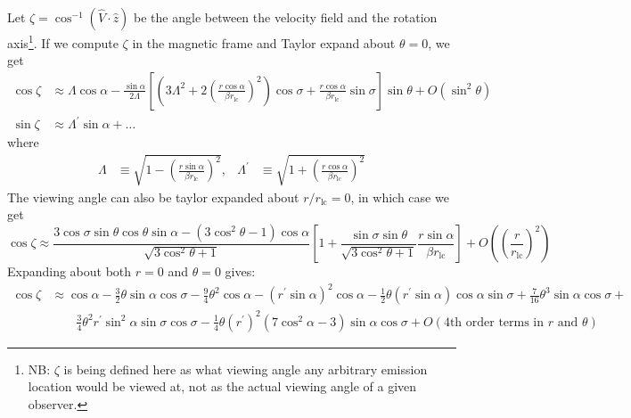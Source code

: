 \documentclass{book}
\newcommand{\rL}{r_\text{lc}} %
\begin{document}
Let $\zeta = \cos^{-1}(\hat{V}\cdot\hat{z})$ be the angle between the velocity field and the rotation axis\footnote{NB: $\zeta$ is being defined here as what viewing angle any arbitrary emission location would be viewed at, not as the actual viewing angle of a given observer.}.
If we compute $\zeta$ in the magnetic frame and Taylor expand about $\theta = 0$, we get
\begin{equation}
    \begin{aligned}
        \cos\zeta &\approx \Lambda\cos\alpha -
            \frac{\sin\alpha}{2\Lambda}\left[\left(3\Lambda^2 + 2\left(\frac{r\cos\alpha}{\beta \rL}\right)^2\right)\cos\sigma +
                \frac{r\cos\alpha}{\beta \rL}\sin\sigma\right] \sin\theta + O(\sin^2\theta) \\
        \sin\zeta &\approx \Lambda^\prime \sin\alpha + \dots
    \end{aligned}
    \label{eqn:zeta_th}
\end{equation}
where
\begin{align}
    \Lambda &\equiv \sqrt{1-\left(\frac{r\sin\alpha}{\beta \rL}\right)^2}, &
    \Lambda^\prime &\equiv \sqrt{1+\left(\frac{r\cos\alpha}{\beta \rL}\right)^2}
\end{align}
The viewing angle can also be taylor expanded about $r/\rL = 0$, in which case we get
\begin{equation}
    \cos\zeta \approx
        \frac{3\cos\sigma\sin\theta\cos\theta\sin\alpha - (3\cos^2\theta - 1)\cos\alpha}{\sqrt{3\cos^2\theta + 1}}
        \left[1 + \frac{\sin\sigma\sin\theta}{\sqrt{3\cos^2\theta+1}} \frac{r\sin\alpha}{\beta \rL}\right] +
        O\left(\left(\frac{r}{\rL}\right)^2\right)
    \label{eqn:viewingangle_taylor}
\end{equation}
Expanding about both $r = 0$ and $\theta = 0$ gives:
\begin{equation}
    \begin{aligned}
        \cos\zeta &\approx \cos\alpha - \frac32\theta\sin\alpha\cos\sigma -
            \frac94\theta^2\cos\alpha - (r^\prime\sin\alpha)^2\cos\alpha -
            \frac12\theta(r^\prime\sin\alpha)\cos\alpha\sin\sigma +
            \frac{7}{16}\theta^3\sin\alpha\cos\sigma + \\
            &\qquad \frac34 \theta^2 r^\prime\sin^2\alpha\sin\sigma\cos\sigma -
            \frac14 \theta (r^\prime)^2(7\cos^2\alpha-3)\sin\alpha\cos\sigma +
            O(\text{4th order terms in $r$ and $\theta$})
    \end{aligned}
\end{equation}
\end{document}
